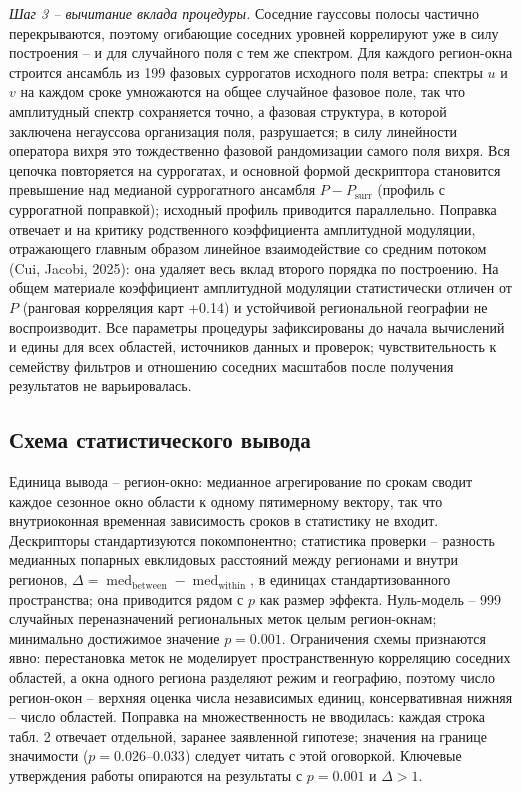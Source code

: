 \documentclass[12pt,a4paper]{article}
\newcommand{\Psurr}{P_{\mathrm{surr}}}
\begin{document}
\emph{Шаг 3 -- вычитание вклада процедуры.} Соседние гауссовы полосы частично перекрываются, поэтому огибающие соседних уровней коррелируют уже в силу построения -- и для случайного поля с тем же спектром. Для каждого регион-окна строится ансамбль из 199 фазовых суррогатов исходного поля ветра: спектры $u$ и $v$ на каждом сроке умножаются на общее случайное фазовое поле, так что амплитудный спектр сохраняется точно, а фазовая структура, в которой заключена негауссова организация поля, разрушается; в силу линейности оператора вихря это тождественно фазовой рандомизации самого поля вихря. Вся цепочка повторяется на суррогатах, и основной формой дескриптора становится превышение над медианой суррогатного ансамбля $P - \Psurr$ (профиль с суррогатной поправкой); исходный профиль приводится параллельно. Поправка отвечает и на критику родственного коэффициента амплитудной модуляции, отражающего главным образом линейное взаимодействие со средним потоком (Cui, Jacobi, 2025): она удаляет весь вклад второго порядка по построению. На общем материале коэффициент амплитудной модуляции статистически отличен от $P$ (ранговая корреляция карт +0.14) и устойчивой региональной географии не воспроизводит. Все параметры процедуры зафиксированы до начала вычислений и едины для всех областей, источников данных и проверок; чувствительность к семейству фильтров и отношению соседних масштабов после получения результатов не варьировалась.

\subsection{Схема статистического вывода}

Единица вывода -- регион-окно: медианное агрегирование по срокам сводит каждое сезонное окно области к одному пятимерному вектору, так что внутриоконная временная зависимость сроков в статистику не входит. Дескрипторы стандартизуются покомпонентно; статистика проверки -- разность медианных попарных евклидовых расстояний между регионами и внутри регионов, $\Delta = \operatorname{med}_{\mathrm{between}} - \operatorname{med}_{\mathrm{within}}$, в единицах стандартизованного пространства; она приводится рядом с $p$ как размер эффекта. Нуль-модель -- 999 случайных переназначений региональных меток целым регион-окнам; минимально достижимое значение $p = 0.001$. Ограничения схемы признаются явно: перестановка меток не моделирует пространственную корреляцию соседних областей, а окна одного региона разделяют режим и географию, поэтому число регион-окон -- верхняя оценка числа независимых единиц, консервативная нижняя -- число областей. Поправка на множественность не вводилась: каждая строка табл. 2 отвечает отдельной, заранее заявленной гипотезе; значения на границе значимости ($p = 0.026$--$0.033$) следует читать с этой оговоркой. Ключевые утверждения работы опираются на результаты с $p = 0.001$ и $\Delta > 1$.
\end{document}
